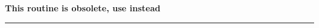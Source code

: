 
\sloppy


 \section[read\_asctab*]{ }
\label{sub:read_asctab}
\author{Eric Hivon, Frode K.~Hansen}

\begin{facility}
{ {\bf This routine is obsolete, use  instead} }
{\modFitstools}
\end{facility}

\rule{\hsize}{2mm}

\newpage
